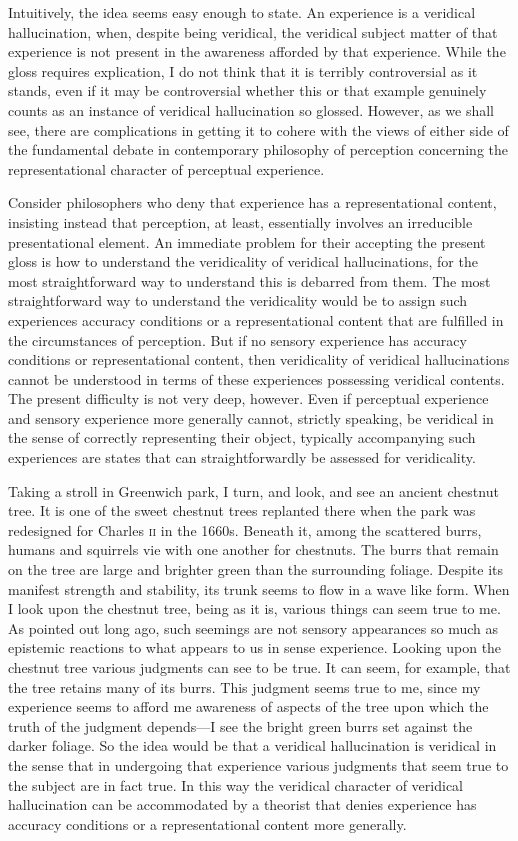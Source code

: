 \documentclass[12pt]{article}
\begin{document}
Intuitively, the idea seems easy enough to state. An experience is a veridical hallucination, when, despite being veridical, the veridical subject matter of that experience is not present in the awareness afforded by that experience. While the gloss requires explication, I do not think that it is terribly controversial as it stands, even if it may be controversial whether this or that example genuinely counts as an instance of veridical hallucination so glossed. However, as we shall see, there are complications in getting it to cohere with the views of either side of the fundamental debate in contemporary philosophy of perception concerning the representational character of perceptual experience.

Consider philosophers who deny that experience has a representational content, insisting instead that perception, at least, essentially involves an irreducible presentational element. An immediate problem for their accepting the present gloss is how to understand the veridicality of veridical hallucinations, for the most straightforward way to understand this is debarred from them. The most straightforward way to understand the veridicality would be to assign such experiences accuracy conditions or a representational content that are fulfilled in the circumstances of perception. But if no sensory experience has accuracy conditions or representational content, then veridicality of veridical hallucinations cannot be understood in terms of these experiences possessing veridical contents. The present difficulty is not very deep, however. Even if perceptual experience and sensory experience more generally cannot, strictly speaking, be veridical in the sense of correctly representing their object, typically accompanying such experiences are states that can straightforwardly be assessed for veridicality. 

Taking a stroll in Greenwich park, I turn, and look, and see an ancient chestnut tree. It is one of the sweet chestnut trees replanted there when the park was redesigned for Charles \textsc{ii} in the 1660s. Beneath it, among the scattered burrs, humans and squirrels vie with one another for chestnuts. The burrs that remain on the tree are large and brighter green than the surrounding foliage. Despite its manifest strength and stability, its trunk seems to flow in a wave like form. When I look upon the chestnut tree, being as it is, various things can seem true to me. As \citet{Price:1952ix} pointed out long ago, such seemings are not sensory appearances so much as epistemic reactions to what appears to us in sense experience. Looking upon the chestnut tree various judgments can see to be true. It can seem, for example, that the tree retains many of its burrs. This judgment seems true to me, since my experience seems to afford me awareness of aspects of the tree upon which the truth of the judgment depends---I see the bright green burrs set against the darker foliage. So the idea would be that a veridical hallucination is veridical in the sense that in undergoing that experience various judgments that seem true to the subject are in fact true. In this way the veridical character of veridical hallucination can be accommodated by a theorist that denies experience has accuracy conditions or a representational content more generally.
\end{document}
